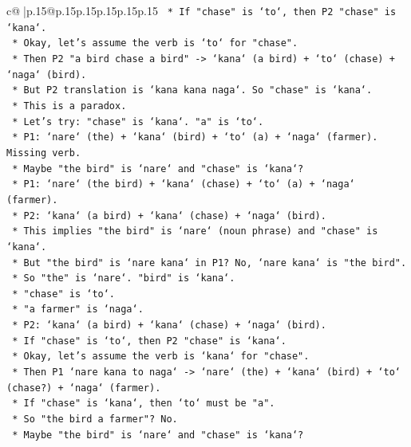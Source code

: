 \documentclass{article}
\begin{document}
{\begin{supertabular}{c@{$\;$}|p{.15\linewidth}@{}p{.15\linewidth}p{.15\linewidth}p{.15\linewidth}p{.15\linewidth}p{.15\linewidth}}
{{{\texttt{            *   If "chase" is `to`, then P2 "chase" is `kana`.} \\
\texttt{            *   Okay, let's assume the verb is `to` for "chase".} \\
\texttt{            *   Then P2 "a bird chase a bird" {-}> `kana` (a bird) + `to` (chase) + `naga` (bird).} \\
\texttt{            *   But P2 translation is `kana kana naga`. So "chase" is `kana`.} \\
\texttt{            *   This is a paradox.} \\
\texttt{            *   Let's try: "chase" is `kana`. "a" is `to`.} \\
\texttt{            *   P1: `nare` (the) + `kana` (bird) + `to` (a) + `naga` (farmer). Missing verb.} \\
\texttt{            *   Maybe "the bird" is `nare` and "chase" is `kana`?} \\
\texttt{            *   P1: `nare` (the bird) + `kana` (chase) + `to` (a) + `naga` (farmer).} \\
\texttt{            *   P2: `kana` (a bird) + `kana` (chase) + `naga` (bird).} \\
\texttt{            *   This implies "the bird" is `nare` (noun phrase) and "chase" is `kana`.} \\
\texttt{            *   But "the bird" is `nare kana` in P1? No, `nare kana` is "the bird".} \\
\texttt{            *   So "the" is `nare`. "bird" is `kana`.} \\
\texttt{            *   "chase" is `to`.} \\
\texttt{            *   "a farmer" is `naga`.} \\
\texttt{            *   P2: `kana` (a bird) + `kana` (chase) + `naga` (bird).} \\
\texttt{            *   If "chase" is `to`, then P2 "chase" is `kana`.} \\
\texttt{            *   Okay, let's assume the verb is `kana` for "chase".} \\
\texttt{            *   Then P1 `nare kana to naga` {-}> `nare` (the) + `kana` (bird) + `to` (chase?) + `naga` (farmer).} \\
\texttt{            *   If "chase" is `kana`, then `to` must be "a".} \\
\texttt{            *   So "the bird a farmer"? No.} \\
\texttt{            *   Maybe "the bird" is `nare` and "chase" is `kana`?} \\
}}}
\end{supertabular}}
\end{document}
